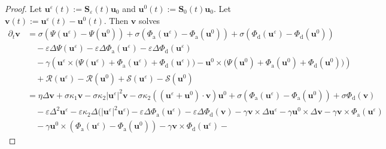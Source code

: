\documentclass[10pt,a4paper]{amsart}
\newcommand{\bff}{\boldsymbol}
\begin{document}
\begin{proof}
Let $\bff{u}^\varepsilon(t):= \bff{S}_\varepsilon(t) \bff{u}_0$ and $\bff{u}^0(t):= \bff{S}_0(t) \bff{u}_0$. Let $\bff{v}(t):= \bff{u}^\varepsilon(t)- \bff{u}^0(t)$. Then $\bff{v}$ solves
\begin{align}\label{equ:dtv eq}
    \partial_t \bff{v}
    &=
    \sigma \left(\Psi(\bff{u}^\varepsilon)-\Psi(\bff{u}^0)\right)
    +
    \sigma \left(\Phi_{\mathrm{a}}(\bff{u}^\varepsilon)- \Phi_{\mathrm{a}}(\bff{u}^0) \right)
    +
    \sigma \left(\Phi_{\mathrm{d}}(\bff{u}^\varepsilon)- \Phi_{\mathrm{d}}(\bff{u}^0) \right)
    \nonumber\\
    &\quad
    -
    \varepsilon \Delta \Psi(\bff{u}^\varepsilon)
    -
    \varepsilon \Delta \Phi_{\mathrm{a}}(\bff{u}^\varepsilon) 
    -
    \varepsilon \Delta \Phi_{\mathrm{d}}(\bff{u}^\varepsilon)
    \nonumber\\
    &\quad
    -
    \gamma \left( \bff{u}^\varepsilon \times \big(\Psi(\bff{u}^\varepsilon)+ \Phi_{\mathrm{a}}(\bff{u}^\varepsilon)+ \Phi_{\mathrm{d}}(\bff{u}^\varepsilon)\big) - \bff{u}^0 \times \big(\Psi(\bff{u}^0)+ \Phi_{\mathrm{a}}(\bff{u}^0)+ \Phi_{\mathrm{d}}(\bff{u}^0)\big) \right)
    \nonumber \\
    &\quad
    +
    \mathcal{R}(\bff{u}^\varepsilon)- \mathcal{R}(\bff{u}^0)
    +
    \mathcal{S}(\bff{u}^\varepsilon)- \mathcal{S}(\bff{u}^0)
    \nonumber\\
    &=
    \eta \Delta \bff{v}
    +
    \sigma \kappa_1 \bff{v}
    -
    \sigma \kappa_2 |\bff{u}^\varepsilon|^2 \bff{v}
    -
    \sigma \kappa_2 \left((\bff{u}^\varepsilon+ \bff{u}^0)\cdot \bff{v}\right) \bff{u}^0
    +
    \sigma \left(\Phi_{\mathrm{a}}(\bff{u}^\varepsilon)- \Phi_{\mathrm{a}}(\bff{u}^0) \right)
    +
    \sigma \Phi_{\mathrm{d}}(\bff{v})
    \nonumber\\
    &\quad
    -\varepsilon \Delta^2 \bff{u}^\varepsilon
    -
    \varepsilon\kappa_2 \Delta\big(|\bff{u}^\varepsilon|^2 \bff{u}^\varepsilon \big)
    -
    \varepsilon \Delta \Phi_{\mathrm{a}}(\bff{u}^\varepsilon)
    -
    \varepsilon \Delta \Phi_{\mathrm{d}}(\bff{v}) 
    -
    \gamma \bff{v}\times \Delta \bff{u}^\varepsilon
    -
    \gamma \bff{u}^0 \times \Delta \bff{v}
    -
    \gamma \bff{v}\times \Phi_{\mathrm{a}}(\bff{u}^\varepsilon)
    \nonumber\\
    &\quad
    -
    \gamma \bff{u}^0 \times \left(\Phi_{\mathrm{a}}(\bff{u}^\varepsilon)- \Phi_{\mathrm{a}}(\bff{u}^0)\right)
    -
    \gamma \bff{v}\times \Phi_{\mathrm{d}}(\bff{u}^\varepsilon)
    -

\end{align}
\end{proof}
\end{document}
